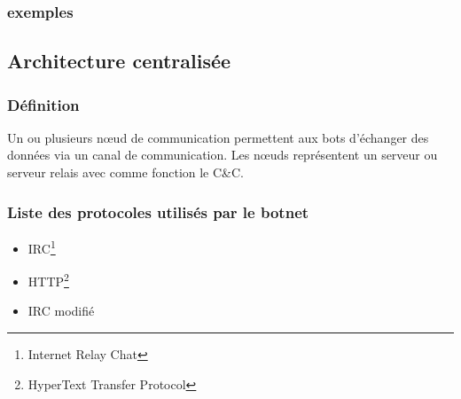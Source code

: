 

\subsubsection{exemples}








\subsection[Architecture  centralisée]{Architecture  centralisée}



%	

\subsubsection{Définition}
Un ou plusieurs nœud de communication permettent aux bots d'échanger des données via un canal de communication.
Les nœuds représentent un serveur ou serveur relais avec comme fonction le C\&C.

\subsubsection{Liste des protocoles utilisés par le botnet}
\begin{itemize}
	\item IRC\footnote{Internet Relay Chat}
	\item HTTP\footnote{HyperText Transfer Protocol}
	\item IRC modifié
\end{itemize}

